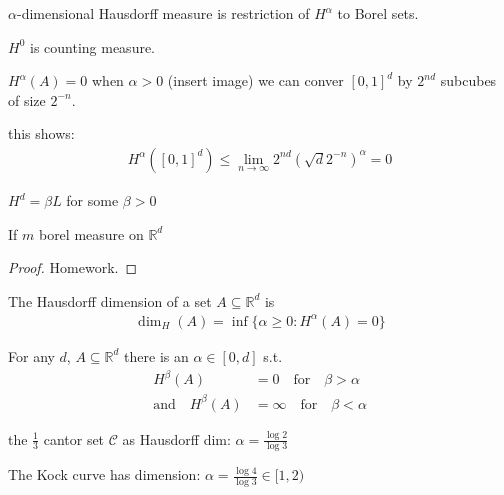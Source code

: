 \begin{definition}
	$\alpha$-dimensional Hausdorff measure is restriction of $H^{\alpha}$ to Borel sets.
\end{definition}


\begin{example}
	$H^{0}$ is counting measure.
\end{example}


\begin{example}
	$H^{\alpha} (A) = 0$ when $\alpha > 0$ 
	(insert image) we can conver  $[0,1]^{d}$ by $2^{nd}$ subcubes of size $2^{-n}$.

	this shows:
	\begin{align*}
		H^{\alpha} ([0,1]^d) \leq \lim_{n \to \infty} 2^{nd}( \sqrt{d} 2^{-n})^{\alpha} = 0
	\end{align*}
\end{example}

\begin{example}
	$H^{d} = \beta L$ for some $\beta > 0$
\end{example}

\begin{theorem}
	If $m$ borel measure on $\mathbb{R}^{d}$
\end{theorem}

\begin{proof}
	Homework.
\end{proof}

\begin{definition}
	The Hausdorff dimension of a set $A \subseteq \mathbb{R}^d$ is
	\begin{align*}
		\dim_{H} (A) = \inf\{\alpha \geq 0 : H^{\alpha} (A) = 0 \}
	\end{align*}
\end{definition}

\begin{lemma}
	For any $d$, $A \subseteq \mathbb{R}^d$ there is an $\alpha \in [0,d]$ s.t. 
	\begin{align*}
					H^{\beta} (A) &= 0 \quad \text{for} \quad  \beta > \alpha \\
		\text{and} \quad H^{\beta} (A) &= \infty \quad \text{for} \quad \beta < \alpha
	\end{align*} 
\end{lemma}


\begin{example}
	the $\frac{1}{3}$ cantor set $\mathcal{C}$ as Hausdorff dim: $\alpha = \frac{\log 2}{\log 3}$
\end{example}

\begin{example}
	The Kock curve has dimension: $\alpha = \frac{\log 4}{\log 3} \in [1,2)$
\end{example}

